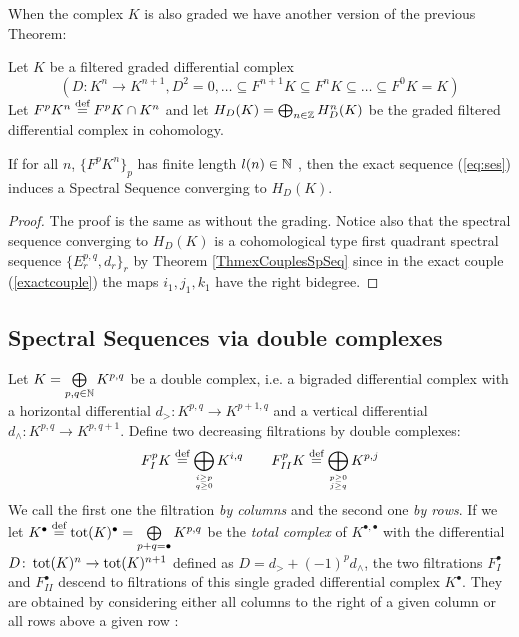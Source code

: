 \documentclass[../main.tex]{subfiles}
\begin{document}
When the complex $K$ is also graded we have another version of the previous Theorem:
\begin{theorem}\label{ThmSpSeqgraded}
    Let $K$ be a filtered graded differential complex 
    \[
    (D \colon K^n \to K^{n+1}  , D^2 = 0  , 
\ldots \subseteq F^{n+1}K\subseteq F^nK\subseteq \ldots \subseteq F^0K = K)
    \]
    Let $F^pK^n \stackrel{\text{def}}{=} F^pK \cap K^n$ and let $H_D(K)= \bigoplus_{n \in \mathbb{Z}} H^n_D(K)$ be the graded filtered differential complex in cohomology. 
    
     If for all $n$, $\{F^pK^n\}_p$ has finite length $l(n) \in \mathbb{N}$ , then the exact sequence  (\ref{eq:ses}) induces a Spectral Sequence converging to $H_D(K)$.
\end{theorem}
\begin{proof}
    The proof is the same as without the grading. Notice also that the spectral sequence converging to $H_D(K)$ is a cohomological type first quadrant spectral sequence $\{E_r^{p,q},d_r\}_{r}$ by Theorem \ref{ThmexCouplesSpSeq} since in the exact couple (\ref{exactcouple}) the maps $i_1, j_1, k_1$ have the right bidegree.
\end{proof}



\subsection{Spectral Sequences via double complexes}

Let $K=\bigoplus\limits_{p,q \in \mathbb{N}} K^{p,q}$ be a double complex, i.e. a bigraded differential complex with a horizontal differential $d_> \colon K^{p,q} \to K^{p+1,q}$ and a vertical differential $d_{\wedge} \colon K^{p,q} \to K^{p,q+1}$. Define two decreasing filtrations by double complexes:
\begin{align*}
    F^p_{I}K \stackrel{\text{def}}{=} \bigoplus\limits_{{i \geq p }\atop{ q \geq 0}} K^{i,q} \qquad
     F^p_{II}K \stackrel{\text{def}}{=} \bigoplus\limits_{{p \geq 0 }\atop{ j \geq q}} K^{p,j}
\end{align*} 
We call the first one the filtration \emph{by columns} and the second one \emph{by rows}. If we let $K^\bullet \stackrel{\text{def}}{=} \operatorname{tot}(K)^\bullet = \bigoplus\limits_{p+q=\bullet} K^{p,q}$ be the \emph{total complex} of $K^{\bullet,\bullet}$ with the differential $D \colon \operatorname{tot}(K)^n \to \operatorname{tot}(K)^{n+1}$ defined as $D=d_> + (-1)^p d_{\wedge}$, the two filtrations $F^\bullet_I$ and $F^\bullet_{II}$ descend to filtrations of this single graded differential complex $K^\bullet$. They are obtained by considering either all columns to the right of a given column or all rows above a given row :
\end{document}
